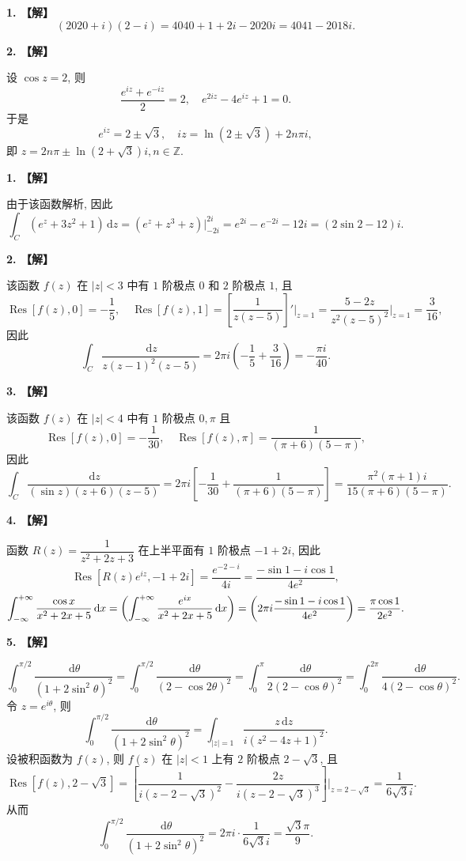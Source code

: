 \documentclass[simple]{hfutexam}
\newcommand{\diff}{\,\mathrm{d}}
\let\Re\relax
\DeclareMathOperator\Re{Re}
\DeclareMathOperator\Res{Res}
\begin{document}
\newpage
{}
\maketitle


\textbf{1. 【解】}
\[(2020+i)(2-i)=4040+1+2i-2020i=4041-2018i.\]

\textbf{2. 【解】}

设 $\cos z=2$, 则
\[\dfrac{e^{iz}+e^{-iz}}{2}=2,\quad e^{2iz}-4e^{iz}+1=0.\]
于是
\[e^{iz}=2\pm \sqrt{3},\quad iz=\ln(2\pm \sqrt{3})+2n\pi i,\]
即 $z=2n\pi\pm \ln(2+\sqrt{3})i,n\in\mathbb{Z}$.


\textbf{1. 【解】}

由于该函数解析, 因此
  \[\int_C(e^z+3z^2+1)\diff z=(e^z+z^3+z)\big|_{-2i}^{2i}
  =e^{2i}-e^{-2i}-12i=(2\sin 2-12)i.\]

\textbf{2. 【解】}

该函数 $f(z)$ 在 $|z|<3$ 中有 $1$ 阶极点 $0$ 和 $2$ 阶极点 $1$, 且
\[\Res[f(z),0]=-\frac{1}{5},\quad \Res[f(z),1]=\left[\frac{1}{z(z-5)}\right]'\bigg|_{z=1}=\frac{5-2z}{z^2(z-5)^2}\bigg|_{z=1}=\frac{3}{16},\]
因此
\[\int_C\dfrac{\diff z}{z(z-1)^2(z-5)}=2\pi i\left(-\frac{1}{5}+\frac{3}{16}\right)=-\frac{\pi i}{40}.\]

\textbf{3. 【解】}

该函数 $f(z)$ 在 $|z|<4$ 中有 $1$ 阶极点 $0, \pi$ 且
\[\Res[f(z),0]=-\frac{1}{30},\quad \Res[f(z),\pi]=\frac{1}{(\pi+6)(5-\pi)},\]
因此
\[\int_C\dfrac{\diff z}{(\sin z)(z+6)(z-5)}=2\pi i\left[-\frac{1}{30}+\frac{1}{(\pi+6)(5-\pi)}\right]=\frac{\pi^2(\pi+1)i}{15(\pi+6)(5-\pi)}.\]

\textbf{4. 【解】}

函数 $R(z)=\dfrac{1}{z^2+2z+3}$ 在上半平面有 $1$ 阶极点 $-1+2i$, 因此
  \[\Res[R(z)e^{iz},-1+2i]=\frac{e^{-2-i}}{4i}=\frac{-\sin 1-i\cos 1}{4e^2},\]
  \[\int_{-\infty}^{+\infty}\dfrac{\cos x}{x^2+2x+5}\diff x=\Re\left(\int_{-\infty}^{+\infty} \frac{e^{ix}}{x^2+2x+5}\diff x\right)=\Re\left(2\pi i\frac{-\sin 1-i\cos 1}{4e^2}\right)=\frac{\pi\cos1}{2e^2}.\]
  
\textbf{5. 【解】}

\[\int_0^{\pi/2}\dfrac{\diff \theta}{(1+2\sin^2\theta)^2}
=\int_0^{\pi/2}\dfrac{\diff \theta}{(2-\cos 2\theta)^2}
=\int_0^{\pi}\dfrac{\diff \theta}{2(2-\cos \theta)^2}
=\int_0^{2\pi}\dfrac{\diff \theta}{4(2-\cos \theta)^2}.
\]
令 $z=e^{i\theta}$, 则
\[\int_0^{\pi/2}\dfrac{\diff \theta}{(1+2\sin^2\theta)^2}=\int_{|z|=1}\frac{z\diff z}{i(z^2-4z+1)^2}.\]
设被积函数为 $f(z)$, 则 $f(z)$ 在 $|z|<1$ 上有 $2$ 阶极点 $2-\sqrt{3}$, 且
\[\Res[f(z),2-\sqrt{3}]=\left[\frac{1}{i(z-2-\sqrt{3})^2}-\frac{2z}{i(z-2-\sqrt{3})^3}\right]\bigg|_{z=2-\sqrt{3}}=\frac{1}{6\sqrt{3}i}.\]
从而
\[\int_0^{\pi/2}\dfrac{\diff \theta}{(1+2\sin^2\theta)^2}=2\pi i\cdot \frac{1}{6\sqrt{3}i}=\frac{\sqrt{3} \pi}{9}.\]
\end{document}
